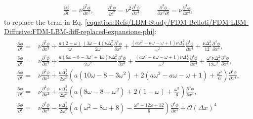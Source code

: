 \documentclass[letterpaper,10pt,english,openany,oneside]{jupyterBook}
\begin{document}
\begin{equation*}
\begin{split}
\frac{\partial\phi}{\partial t} = \nu \frac{\partial^{2}\phi}{\partial x^{2}}, \qquad \frac{\partial^{2}\phi}{\partial t^{2}} = \nu^{2} \frac{\partial^{4}\phi}{\partial x^{4}}, \qquad \frac{\partial^{3}\phi}{\partial x^{2}\partial t} = \nu \frac{\partial^{4}\phi}{\partial x^{4}},
\end{split}
\end{equation*}
\sphinxAtStartPar
to replace the term in Eq. \eqref{equation:Refs/LBM-Study/FDM-Belloti/FDM-LBM-Diffusive:FDM-LBM-diff-replaced-expansions-phi}:
\begin{equation*}
\begin{split}
\begin{array}{rl}
\displaystyle\frac{\partial\phi}{\partial t} =& \nu\displaystyle\frac{\partial^{2}\phi}{\partial x^{2}}  + \frac{a \left(2 - \omega \right)}{\omega} \frac{ \left(3 \omega - 4\right) \nu\Delta_{x}^{2}}{2\omega} \frac{\partial^{4}\phi}{\partial x^{4}} + \frac{\left(a \omega^{2} - a \omega - \omega + 1\right)\nu\Delta_{x}^{2}}{\omega^{2}} \frac{\partial^{4}\phi}{\partial x^{4}} + \frac{\nu\Delta_{x}^{2}}{12} \frac{\partial^{4}\phi}{\partial x^{4}}, \\
\displaystyle\frac{\partial\phi}{\partial t} = & \nu\displaystyle\frac{\partial^{2}\phi}{\partial x^{2}}  + \frac{ a\left(6 \omega - 8 - 3\omega^{2} + 4 \omega \right) \nu\Delta_{x}^{2}}{2\omega^{2}} \frac{\partial^{4}\phi}{\partial x^{4}} + \frac{\left(a \omega^{2} - a \omega - \omega + 1\right)\nu\Delta_{x}^{2}}{\omega^{2}} \frac{\partial^{4}\phi}{\partial x^{4}} + \frac{\omega^{2}\nu\Delta_{x}^{2}}{12\omega^{2}} \frac{\partial^{4}\phi}{\partial x^{4}}, \\
\displaystyle\frac{\partial\phi}{\partial t} = & \nu\displaystyle\frac{\partial^{2}\phi}{\partial x^{2}}  + \frac{\nu\Delta_{x}^{2}}{2\omega^{2}}\left( a\left(10 \omega - 8 - 3\omega^{2} \right)  + 2\left(a \omega^{2} - a \omega - \omega + 1\right) + \frac{\omega^{2}}{6} \right) \frac{\partial^{4}\phi}{\partial x^{4}}, \\
\displaystyle\frac{\partial\phi}{\partial t} = & \nu\displaystyle\frac{\partial^{2}\phi}{\partial x^{2}}  + \frac{\nu\Delta_{x}^{2}}{2\omega^{2}}\left( a\left(8 \omega - 8 - \omega^{2} \right)  + 2\left(1 - \omega \right) + \frac{\omega^{2}}{6} \right) \frac{\partial^{4}\phi}{\partial x^{4}}, \\
\displaystyle\frac{\partial\phi}{\partial t} = & \nu\displaystyle\frac{\partial^{2}\phi}{\partial x^{2}}  - \frac{\nu\Delta_{x}^{2}}{2\omega^{2}}\left( a\left(\omega^{2} - 8 \omega + 8 \right)  - \frac{\omega^{2} - 12\omega + 12 }{6} \right) \frac{\partial^{4}\phi}{\partial x^{4}} + \mathcal{O}(\Delta x)^{4}
\end{array}
\end{split}
\end{equation*}
\end{document}
